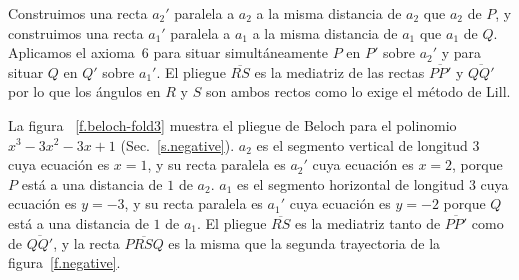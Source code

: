 Construimos una recta $a_2'$ paralela a $a_2$ a la misma distancia de $a_2$ que $a_2$ de $P$, y construimos una recta $a_1'$ paralela a $a_1$ a la misma distancia de $a_1$ que $a_1$ de $Q$. Aplicamos el axioma~6 para situar simultáneamente $P$ en $P'$ sobre $a_2'$ y para situar $Q$ en $Q'$ sobre $a_1'$. El pliegue $\overline{RS}$ es la mediatriz de las rectas $\overline{PP'}$ y $\overline{QQ'}$ por lo que los ángulos en $R$ y $S$ son ambos rectos como lo exige el método de Lill.

La figura ~\ref{f.beloch-fold3} muestra el pliegue de Beloch para el polinomio $x^3-3x^2-3x+1$ (Sec.~\ref{s.negative}). $a_2$ es el segmento vertical de longitud $3$ cuya ecuación es $x=1$, y su recta paralela es $a_2'$ cuya ecuación es $x=2$, porque $P$ está a una distancia de $1$ de $a_2$. $a_1$ es el segmento horizontal de longitud $3$ cuya ecuación es $y=-3$, y su recta paralela es $a_1'$ cuya ecuación es $y=-2$ porque $Q$ está a una distancia de $1$ de $a_1$. El pliegue $\overline{RS}$ es la mediatriz tanto de $\overline{PP'}$ como de $\overline{QQ'}$, y la recta $\overline{PRSQ}$ es la misma que la segunda trayectoria de la figura~\ref{f.negative}.

